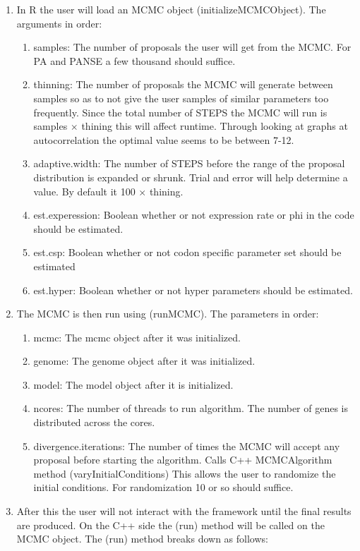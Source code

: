 \documentclass{article}
\begin{document}
\begin{enumerate}
\item In R the user will load an MCMC object (initializeMCMCObject). The arguments in order:
\begin{enumerate}
\item samples: The number of proposals the user will get from the MCMC. For PA and PANSE a few thousand should suffice.
\item thinning: The number of proposals the MCMC will generate between samples so as to not give the user samples of similar parameters too frequently. Since the total number of STEPS the MCMC will run is samples $\times$ thining this will affect runtime. Through looking at graphs at autocorrelation the optimal value seems to be between 7-12.
\item adaptive.width: The number of STEPS before the range of the proposal distribution is expanded or shrunk. Trial and error will help determine a value. By default it 100 $\times$ thining.
\item est.experession: Boolean whether or not expression rate or phi in the code should be estimated.
\item est.csp: Boolean whether or not codon specific parameter set should be estimated
\item est.hyper: Boolean whether or not hyper parameters should be estimated.
\end{enumerate}
\item The MCMC is then run using (runMCMC). The parameters in order:
\begin{enumerate}
\item mcmc: The mcmc object after it was initialized.
\item genome: The genome object after it was initialized.
\item model: The model object after it is initialized.
\item ncores: The number of threads to run algorithm. The number of genes is distributed across the cores.
\item divergence.iterations: The number of times the MCMC will accept any proposal before starting the algorithm. Calls C++ MCMCAlgorithm method (varyInitialConditions) This allows the user to randomize the initial conditions. For randomization 10 or so should suffice.
\end{enumerate}
\item After this the user will not interact with the framework until the final results are produced. On the C++ side the (run) method will be called on the MCMC object. The (run) method breaks down as follows:

\end{enumerate}
\end{document}
